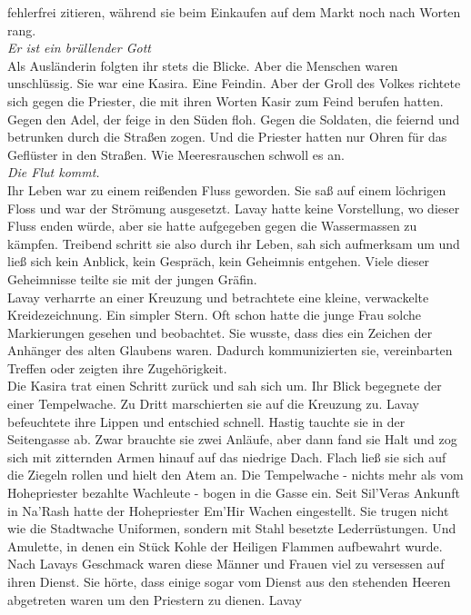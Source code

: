 fehlerfrei zitieren, während sie beim Einkaufen auf dem Markt noch nach Worten rang.\\
\textit{Er ist ein brüllender Gott}\\
Als Ausländerin folgten ihr stets die Blicke. Aber die Menschen waren unschlüssig. Sie war eine 
Kasira. Eine Feindin. Aber der Groll des Volkes richtete sich gegen die Priester, die mit ihren 
Worten Kasir zum Feind berufen hatten. Gegen den Adel, der feige in den Süden floh. Gegen die 
Soldaten, die feiernd und betrunken durch die Straßen zogen. Und die Priester hatten nur 
Ohren für das Geflüster in den Straßen. Wie Meeresrauschen schwoll es an.\\
\textit{Die Flut kommt.}\\
Ihr Leben war zu einem reißenden Fluss geworden. Sie saß auf einem löchrigen Floss und war der 
Strömung ausgesetzt. Lavay hatte keine Vorstellung, wo dieser Fluss enden würde, aber sie hatte 
aufgegeben gegen die Wassermassen zu kämpfen. Treibend schritt sie also durch ihr Leben, sah sich 
aufmerksam um und ließ sich kein Anblick, kein Gespräch, kein Geheimnis entgehen. Viele dieser 
Geheimnisse teilte sie mit der jungen Gräfin.\\
Lavay verharrte an einer Kreuzung und betrachtete eine kleine, verwackelte Kreidezeichnung. Ein 
simpler Stern. Oft schon hatte die junge Frau solche Markierungen gesehen und beobachtet. Sie 
wusste, dass dies ein Zeichen der Anhänger des alten Glaubens waren. Dadurch kommunizierten sie, 
vereinbarten Treffen oder zeigten ihre Zugehörigkeit.\\
Die Kasira trat einen Schritt zurück und sah sich um. Ihr Blick begegnete der einer Tempelwache. Zu 
Dritt marschierten sie auf die Kreuzung zu. Lavay befeuchtete ihre Lippen und entschied schnell. 
Hastig tauchte sie in der Seitengasse ab. Zwar brauchte sie zwei Anläufe, aber dann fand sie Halt 
und zog sich mit zitternden Armen hinauf auf das niedrige Dach. Flach ließ sie sich auf die Ziegeln 
rollen und hielt den Atem an. Die Tempelwache - nichts mehr als vom Hohepriester bezahlte Wachleute 
- bogen in die Gasse ein. Seit Sil'Veras Ankunft in Na'Rash hatte der Hohepriester Em'Hir Wachen 
eingestellt. Sie trugen nicht wie die Stadtwache Uniformen, sondern mit Stahl besetzte 
Lederrüstungen. Und Amulette, in denen ein Stück Kohle der Heiligen Flammen aufbewahrt wurde. Nach 
Lavays Geschmack waren diese Männer und Frauen viel zu versessen auf ihren Dienst. Sie hörte, dass 
einige sogar vom Dienst aus den stehenden Heeren abgetreten waren um den Priestern zu dienen. Lavay 
